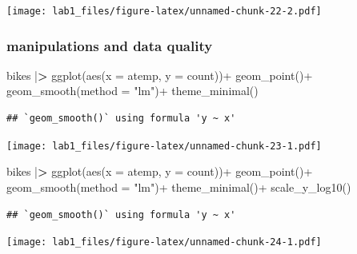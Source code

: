 \documentclass[
]{article}
\newenvironment{Shaded}{\begin{snugshade}}{\end{snugshade}}
\newcommand{\AttributeTok}[1]{\textcolor[rgb]{0.77,0.63,0.00}{#1}}
\newcommand{\ErrorTok}[1]{\textcolor[rgb]{0.64,0.00,0.00}{\textbf{#1}}}
\newcommand{\FunctionTok}[1]{\textcolor[rgb]{0.00,0.00,0.00}{#1}}
\newcommand{\NormalTok}[1]{#1}
\newcommand{\SpecialCharTok}[1]{\textcolor[rgb]{0.00,0.00,0.00}{#1}}
\newcommand{\StringTok}[1]{\textcolor[rgb]{0.31,0.60,0.02}{#1}}
\begin{document}
\texttt{[image: lab1\_files/figure-latex/unnamed-chunk-22-2.pdf]}

\hypertarget{manipulations-and-data-quality}{%
\subsubsection{manipulations and data
quality}\label{manipulations-and-data-quality}}

\begin{Shaded}
\begin{Highlighting}[]
\NormalTok{bikes }\SpecialCharTok{|}\ErrorTok{\textgreater{}} 
  \FunctionTok{ggplot}\NormalTok{(}\FunctionTok{aes}\NormalTok{(}\AttributeTok{x =}\NormalTok{ atemp, }\AttributeTok{y =}\NormalTok{ count))}\SpecialCharTok{+}
  \FunctionTok{geom\_point}\NormalTok{()}\SpecialCharTok{+}
  \FunctionTok{geom\_smooth}\NormalTok{(}\AttributeTok{method =} \StringTok{"lm"}\NormalTok{)}\SpecialCharTok{+}
  \FunctionTok{theme\_minimal}\NormalTok{()}
\end{Highlighting}
\end{Shaded}

\begin{verbatim}
## `geom_smooth()` using formula 'y ~ x'
\end{verbatim}

\texttt{[image: lab1\_files/figure-latex/unnamed-chunk-23-1.pdf]}

\begin{Shaded}
\begin{Highlighting}[]
\NormalTok{bikes }\SpecialCharTok{|}\ErrorTok{\textgreater{}} 
  \FunctionTok{ggplot}\NormalTok{(}\FunctionTok{aes}\NormalTok{(}\AttributeTok{x =}\NormalTok{ atemp, }\AttributeTok{y =}\NormalTok{ count))}\SpecialCharTok{+}
  \FunctionTok{geom\_point}\NormalTok{()}\SpecialCharTok{+}
  \FunctionTok{geom\_smooth}\NormalTok{(}\AttributeTok{method =} \StringTok{"lm"}\NormalTok{)}\SpecialCharTok{+}
  \FunctionTok{theme\_minimal}\NormalTok{()}\SpecialCharTok{+}
    \FunctionTok{scale\_y\_log10}\NormalTok{()}
\end{Highlighting}
\end{Shaded}

\begin{verbatim}
## `geom_smooth()` using formula 'y ~ x'
\end{verbatim}

\texttt{[image: lab1\_files/figure-latex/unnamed-chunk-24-1.pdf]}
\end{document}
